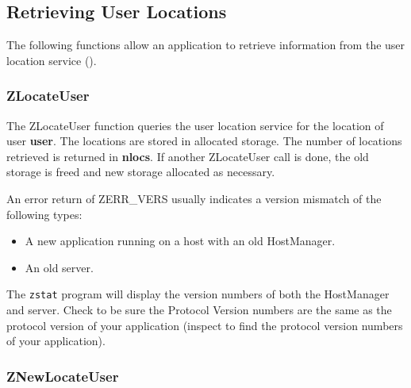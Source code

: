%
\subsection{Retrieving User Locations}
\label{retrieving-locations}

The following functions allow an application to retrieve information
from the user location service ().

\subsubsection{ZLocateUser}
\label{ZLocateUser}

\etemplate
{}

The ZLocateUser function queries the user location service for the
location of user {\bf user}.  The locations are stored in allocated
storage.  The number of locations retrieved is returned in {\bf *nlocs}.
If another ZLocateUser call is done, the old storage is freed and new
storage allocated as necessary.

An error return of ZERR_VERS usually indicates a version mismatch of the
following types:
\begin{itemize}
\item A new application running on a host with an old HostManager.
\item An old server.
\end{itemize}
The {\tt zstat} program will display the version numbers of both the
HostManager and server.  Check to be sure the Protocol Version numbers
are the same as the protocol version of your application (inspect
 to find the protocol version
numbers of your application).

\subsubsection{ZNewLocateUser}
\label{ZNewLocateUser}

\etemplate
{}

